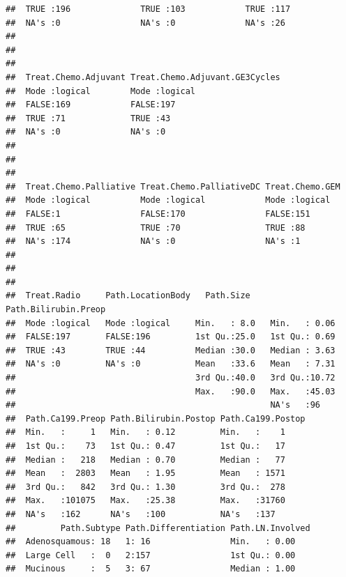 \documentclass{article}\usepackage[]{graphicx}\usepackage[]{color}
\makeatletter
\newenvironment{kframe}{%
 \def\at@end@of@kframe{}%
 \ifinner\ifhmode%
  \def\at@end@of@kframe{\end{minipage}}%
  \begin{minipage}{\columnwidth}%
 \fi\fi%
 \def\FrameCommand##1{\hskip\@totalleftmargin \hskip-\fboxsep
 \colorbox{shadecolor}{##1}\hskip-\fboxsep
     \hskip-\linewidth \hskip-\@totalleftmargin \hskip\columnwidth}%
 \MakeFramed {\advance\hsize-\width
   \@totalleftmargin\z@ \linewidth\hsize
   \@setminipage}}%
 {\par\unskip\endMakeFramed%
 \at@end@of@kframe}
\newenvironment{knitrout}{}{} %
\makeatother
\begin{document}
\begin{knitrout}
\begin{kframe}
\begin{verbatim}
##  TRUE :196              TRUE :103            TRUE :117      
##  NA's :0                NA's :0              NA's :26       
##                                                             
##                                                             
##                                                             
##  Treat.Chemo.Adjuvant Treat.Chemo.Adjuvant.GE3Cycles
##  Mode :logical        Mode :logical                 
##  FALSE:169            FALSE:197                     
##  TRUE :71             TRUE :43                      
##  NA's :0              NA's :0                       
##                                                     
##                                                     
##                                                     
##  Treat.Chemo.Palliative Treat.Chemo.PalliativeDC Treat.Chemo.GEM
##  Mode :logical          Mode :logical            Mode :logical  
##  FALSE:1                FALSE:170                FALSE:151      
##  TRUE :65               TRUE :70                 TRUE :88       
##  NA's :174              NA's :0                  NA's :1        
##                                                                 
##                                                                 
##                                                                 
##  Treat.Radio     Path.LocationBody   Path.Size    Path.Bilirubin.Preop
##  Mode :logical   Mode :logical     Min.   : 8.0   Min.   : 0.06       
##  FALSE:197       FALSE:196         1st Qu.:25.0   1st Qu.: 0.69       
##  TRUE :43        TRUE :44          Median :30.0   Median : 3.63       
##  NA's :0         NA's :0           Mean   :33.6   Mean   : 7.31       
##                                    3rd Qu.:40.0   3rd Qu.:10.72       
##                                    Max.   :90.0   Max.   :45.03       
##                                                   NA's   :96          
##  Path.Ca199.Preop Path.Bilirubin.Postop Path.Ca199.Postop
##  Min.   :     1   Min.   : 0.12         Min.   :    1    
##  1st Qu.:    73   1st Qu.: 0.47         1st Qu.:   17    
##  Median :   218   Median : 0.70         Median :   77    
##  Mean   :  2803   Mean   : 1.95         Mean   : 1571    
##  3rd Qu.:   842   3rd Qu.: 1.30         3rd Qu.:  278    
##  Max.   :101075   Max.   :25.38         Max.   :31760    
##  NA's   :162      NA's   :100           NA's   :137      
##         Path.Subtype Path.Differentiation Path.LN.Involved
##  Adenosquamous: 18   1: 16                Min.   : 0.00   
##  Large Cell   :  0   2:157                1st Qu.: 0.00   
##  Mucinous     :  5   3: 67                Median : 1.00   

\end{verbatim}
\end{kframe}
\end{knitrout}
\end{document}
